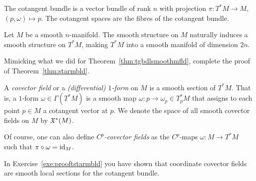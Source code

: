 The cotangent bundle is a vector bundle of rank $n$ with projection $\pi:T^*M\to M$, $(p,\omega)\mapsto p$.
The cotangent spaces are the fibres of the cotangent bundle.

\begin{theorem}\label{thm:starmbld}
  Let $M$ be a smooth $n$-manifold.
  The smooth structure on $M$ naturally induces a smooth structure on $T^*M$, making $T^*M$ into a smooth manifold of dimension $2n$.
\end{theorem}
\begin{exercise}\label{exe:prooftstarmbld}
  Mimicking what we did for Theorem~\ref{thm:tgbdlsmoothmfld}, complete the proof of Theorem~\ref{thm:starmbld}.
\end{exercise}

\begin{definition}\label{def:covfield}
  A \emph{covector field} or a \emph{(differential) $1$-form} on $M$ is a smooth section of $T^*M$.
  That is, a $1$-form $\omega\in\Gamma(T^*M)$ is a smooth map $\omega: p \to \omega_p \in T_p^*M$ that assigns to each point $p\in M$ a cotangent vector at $p$.
  We denote the space of all smooth covector fields on $M$ by $\mathfrak{X}^*(M)$.

  Of course, one can also define \emph{$C^p$-covector fields} as the $C^p$-maps $\omega:M\to T^*M$ such that $\pi\circ\omega = \operatorname{id}_M$.
\end{definition}

\begin{remark}
  In Exercise~\ref{exe:prooftstarmbld} you have shown that coordinate covector fields are smooth local sections for the cotangent bundle.
\end{remark}

